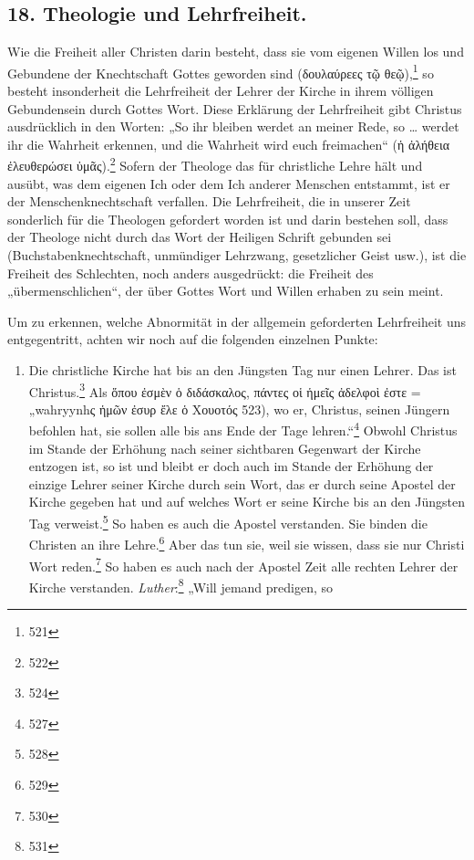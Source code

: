 \usepackage{upgreek}

\subsection*{18. Theologie und Lehrfreiheit.}

Wie die Freiheit aller Christen darin besteht, dass sie vom eigenen Willen los und Gebundene der Knechtschaft Gottes geworden sind (\textgreek{δουλαύρεες τῷ θεῷ}),\footnote{521} so besteht insonderheit die Lehrfreiheit der Lehrer der Kirche in ihrem völligen Gebundensein durch Gottes Wort. Diese Erklärung der Lehrfreiheit gibt Christus ausdrücklich in den Worten: „So ihr bleiben werdet an meiner Rede, so \ldots{} werdet ihr die Wahrheit erkennen, und die Wahrheit wird euch freimachen“ (\textgreek{ἡ ἀλήθεια ἐλευθερώσει ὑμᾶς}).\footnote{522} Sofern der Theologe das für christliche Lehre hält und ausübt, was dem eigenen Ich oder dem Ich anderer Menschen entstammt, ist er der Menschenknechtschaft verfallen. Die Lehrfreiheit, die in unserer Zeit sonderlich für die Theologen gefordert worden ist und darin bestehen soll, dass der Theologe nicht durch das Wort der Heiligen Schrift gebunden sei (Buchstabenknechtschaft, unmündiger Lehrzwang, gesetzlicher Geist usw.), ist die Freiheit des Schlechten, noch anders ausgedrückt: die Freiheit des „übermenschlichen“, der über Gottes Wort und Willen erhaben zu sein meint.

Um zu erkennen, welche Abnormität in der allgemein geforderten Lehrfreiheit uns entgegentritt, achten wir noch auf die folgenden einzelnen Punkte:
\begin{enumerate}
    \item Die christliche Kirche hat bis an den Jüngsten Tag nur einen Lehrer. Das ist Christus.\footnote{524} Als \textgreek{ὅπου ἐσμὲν ὁ διδάσκαλος, πάντες οἱ ἡμεῖς ἀδελφοὶ ἐστε} = „wahryynhς \textgreek{ἡμῶν ἐσυρ ἔλε ὁ Χουοτός} 523), wo er, Christus, seinen Jüngern befohlen hat, sie sollen alle bis ans Ende der Tage lehren.“\footnote{527} Obwohl Christus im Stande der Erhöhung nach seiner sichtbaren Gegenwart der Kirche entzogen ist, so ist und bleibt er doch auch im Stande der Erhöhung der einzige Lehrer seiner Kirche durch sein Wort, das er durch seine Apostel der Kirche gegeben hat und auf welches Wort er seine Kirche bis an den Jüngsten Tag verweist.\footnote{528} So haben es auch die Apostel verstanden. Sie binden die Christen an ihre Lehre.\footnote{529} Aber das tun sie, weil sie wissen, dass sie nur Christi Wort reden.\footnote{530} So haben es auch nach der Apostel Zeit alle rechten Lehrer der Kirche verstanden. \textit{Luther}:\footnote{531} „Will jemand predigen, so
\end{enumerate}

\vspace{1em} 

\RaggedRight 
\footnotesize
\noindent 
{}
